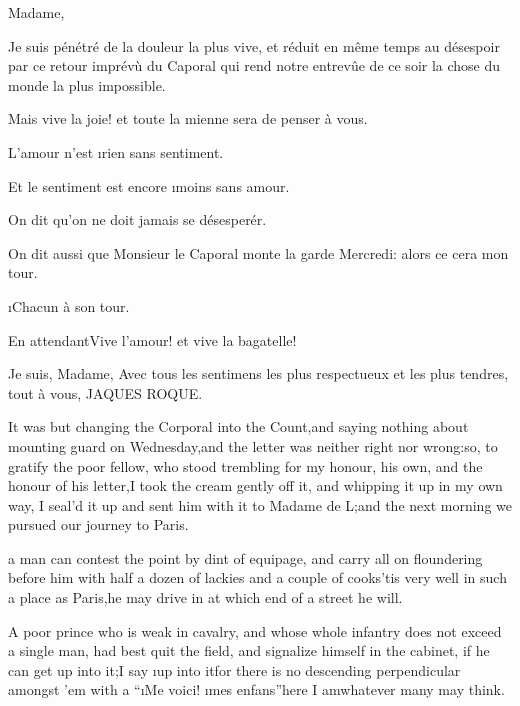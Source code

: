 \documentclass[twoside]{article}
\begin{document}


Madame,

Je suis pénétré de la douleur la plus vive, et réduit en même temps au
désespoir par ce retour imprévù du Caporal qui rend notre entrevûe de ce
soir la chose du monde la plus impossible.

Mais vive la joie! et toute la mienne sera de penser à vous.

L’amour n’est \i{rien} sans sentiment.

Et le sentiment est encore \i{moins} sans amour.

On dit qu’on ne doit jamais se désesperér.

On dit aussi que Monsieur le Caporal monte la garde Mercredi: alors ce
cera mon tour.

                           \i{Chacun à son tour}.

En attendant\tsk Vive l’amour! et vive la bagatelle!

                                                          Je suis, Madame,
                                          Avec tous les sentimens les plus
                                          respectueux et les plus tendres,
                                                              tout à vous,
                                                             JAQUES ROQUE.

It was but changing the Corporal into the Count,\tsk and saying nothing about
mounting guard on Wednesday,\tsk and the letter was neither right nor
wrong:\tsk so, to gratify the poor fellow, who stood trembling for my honour,
his own, and the honour of his letter,\tsk I took the cream gently off it,
and whipping it up in my own way, I seal’d it up and sent him with it to
Madame de L\tsk ;\tsk and the next morning we pursued our journey to Paris.






 a man can contest the point by dint of equipage, and carry all on
floundering before him with half a dozen of lackies and a couple of
cooks\tsk ’tis very well in such a place as Paris,\tsk he may drive in at which
end of a street he will.

A poor prince who is weak in cavalry, and whose whole infantry does not
exceed a single man, had best quit the field, and signalize himself in
the cabinet, if he can get up into it;\tsk I say \i{up into it}\tsk for there is no
descending perpendicular amongst ’em with a “\i{Me voici}! \i{mes
enfans}”\tsk here I am\tsk whatever many may think.
\end{document}
